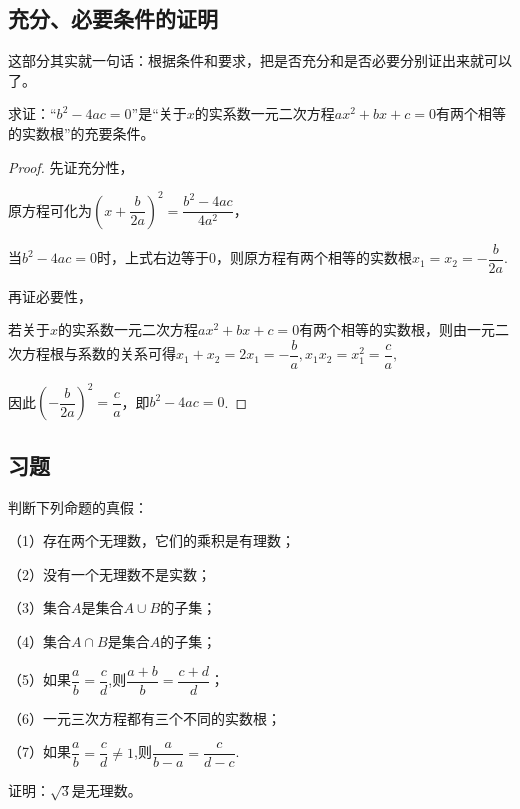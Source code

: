 \documentclass[lang=cn,math=cm,chinesefont=nofont,11pt,scheme=chinese,onecol]{elegantbook}
\begin{document}
\subsection{充分、必要条件的证明}

这部分其实就一句话：根据条件和要求，把是否充分和是否必要分别证出来就可以了。

\begin{example}\label{HS2FZ_lkb1_P26.1}
  求证：“$b^2-4ac=0$”是“关于$x$的实系数一元二次方程$ax^2+bx+c=0$有两个相等的实数根”的充要条件。
\end{example}

\begin{proof}
  先证充分性，

  原方程可化为$\left(x+\dfrac{b}{2a}\right)^{2}=\dfrac{b^{2}-4ac}{4a^{2}}$，

  当$b^2-4ac=0$时，上式右边等于0，则原方程有两个相等的实数根$x_1=x_2=-\dfrac{b}{2a}$.

  再证必要性，
  
  若关于$x$的实系数一元二次方程$ax^2+bx+c=0$有两个相等的实数根，则由一元二次方程根与系数的关系可得$x_{1}+x_{2}=2x_{1}=-\dfrac{b}{a},x_{1}x_{2}=x_{1}^{2}=\dfrac{c}{a},$

  因此$\left(-\dfrac{b}{2a}\right)^{2}=\dfrac{c}{a}$，即$b^2-4ac=0$.
\end{proof}

\subsection{习题}

\begin{exercise}\label{2017RJB_bx1_P26}
  判断下列命题的真假：

  （1）存在两个无理数，它们的乘积是有理数；

  （2）没有一个无理数不是实数；

  （3）集合$A$是集合$A\cup B$的子集；

  （4）集合$A\cap B$是集合$A$的子集；

  （5）如果$\dfrac ab=\dfrac cd$,则$\dfrac{a+b}b=\dfrac{c+d}{d}$；

  （6）一元三次方程都有三个不同的实数根；
  
  （7）如果$\dfrac ab=\dfrac cd\neq 1$,则$\dfrac a{b-a}=\dfrac c{d-c}$.
\end{exercise}

\begin{exercise}\label{202407081520}
  证明：$\sqrt{3}$是无理数。
\end{exercise}
\end{document}
